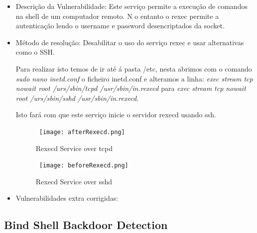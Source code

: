 \begin{itemize}
\item Descrição da Vulnerabilidade: Este serviço permite a execução de comandos na shell de um computador remoto. N o entanto o rexec permite a autenticação lendo o username e password desencriptados da socket.

\item Método de resolução: Desabilitar o uso do serviço rexec e usar alternativas como o SSH.
\par Para realizar isto temos de ir até á pasta /etc, nesta abrimos com o comando \textit{sudo nano inetd.conf} o ficheiro inetd.conf e alteramos a linha: \textit{exec   stream    tcp  nowait  root /urs/sbin/tcpd  /usr/sbin/in.rexecd} para \textit{exec   stream    tcp  nowait  root /urs/sbin/sshd  /usr/sbin/in.rexecd}.
\par Isto fará com que este serviço inicie o servidor rexecd usando ssh. 
\begin{figure}[H]

  \centering

  \hbox{\hspace{-6em} \texttt{[image: afterRexecd.png]}}

  \caption {Rexecd Service over tcpd}

  \label {fig3}

\end{figure}
\begin{figure}[H]

  \centering

  \hbox{\hspace{-6em} \texttt{[image: beforeRexecd.png]}}

  \caption {Rexecd Service over sshd}

  \label {fig3}

\end{figure}
\item Vulnerabilidades extra corrigidas:
\end{itemize}

\subsection{Bind Shell Backdoor Detection}

